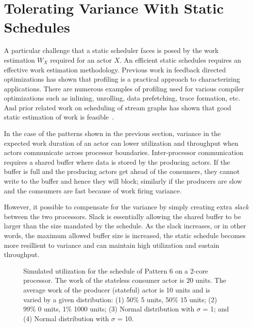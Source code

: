 \section{Tolerating Variance With Static Schedules}

A particular challenge that a static scheduler faces is posed by the
work estimation $W_X$ required for an actor $X$. An efficient static
schedules requires an effective work estimation methodology. Previous
work in feedback directed optimizations has shown that profiling is a
practical approach to characterizing applications. There are numerous
examples of profiling used for various compiler optimizations such as
inlining, unrolling, data prefetching, trace formation, etc. And prior
related work on scheduling of stream graphs has shown that good static
estimation of work is
feasible~\cite{mgordon-asplos04,mgordon-asplos06}.

In the case of the patterns shown in the previous section, variance in
the expected work duration of an actor can lower utilization and
throughput when actors communicate across processor
boundaries. Inter-processor communication requires a shared buffer
where data is stored by the producing actors. If the buffer is full
and the producing actors get ahead of the consumers, they cannot write
to the buffer and hence they will block; similarly if the producers
are slow and the comsumers are fast because of work firing variance.

However, it possible to compensate for the variance by simply creating
extra {\it slack} between the two processors. Slack is essentially
allowing the shared buffer to be larger than the size mandated by the
schedule. As the slack increases, or in other words, the maximum
allowed buffer size is increased, the static schedule becomes more
resillient to variance and can maintain high utilization and sustain
throughput.

\begin{figure}[t]
\begin{center}
\caption{{\small Simulated utilization for the schedule of Pattern 6 on 
a 2-core processor.  The work of the stateless consumer actor is 20
units. The average work of the producer (stateful) actor is 10 units
and is varied by a given distribution: (1) 50\% 5 units, 50\% 15
units; (2) 99\% 0 units, 1\% 1000 units; (3) Normal distribution with
$\sigma$ = 1; and (4) Normal distribution with $\sigma$ = 10.
\protect\label{fig:variance-chart}}}
\end{center}
\end{figure}

